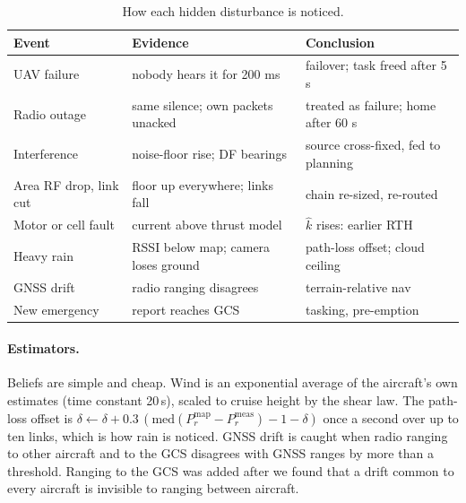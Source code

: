 \documentclass[10pt,a4paper,twocolumn]{article}
\begin{document}
\begin{table}[t]
\centering
\caption{How each hidden disturbance is noticed.}
\label{tab:dist}
\footnotesize
\renewcommand{\arraystretch}{1.1}
\begin{tabularx}{\columnwidth}{@{}>{\raggedright\arraybackslash}p{15mm}>{\raggedright\arraybackslash}X>{\raggedright\arraybackslash}X@{}}
\toprule
\textsf{\textbf{Event}} & \textsf{\textbf{Evidence}} & \textsf{\textbf{Conclusion}}\\
\midrule
UAV failure & nobody hears it for 200 ms & failover; task freed after 5 s\\
Radio outage & same silence; own packets unacked & treated as failure; home after 60 s\\
Interference & noise-floor rise; DF bearings & source cross-fixed, fed to planning\\
Area RF drop, link cut & floor up everywhere; links fall & chain re-sized, re-routed\\
Motor or cell fault & current above thrust model & $\hat k$ rises: earlier RTH\\
Heavy rain & RSSI below map; camera loses ground & path-loss offset; cloud ceiling\\
GNSS drift & radio ranging disagrees & terrain-relative nav\\
New emergency & report reaches GCS & tasking, pre-emption\\
\bottomrule
\end{tabularx}
\end{table}

\paragraph{Estimators.} Beliefs are simple and cheap. Wind is an exponential average of the aircraft's own estimates (time constant 20\,s), scaled to cruise height by the shear law. The path-loss offset is $\delta\leftarrow\delta+0.3\,(\mathrm{med}(P^{\mathrm{map}}_r-P^{\mathrm{meas}}_r)-1-\delta)$ once a second over up to ten links, which is how rain is noticed. GNSS drift is caught when radio ranging to other aircraft and to the GCS disagrees with GNSS ranges by more than a threshold. Ranging to the GCS was added after we found that a drift common to every aircraft is invisible to ranging between aircraft.
\end{document}
